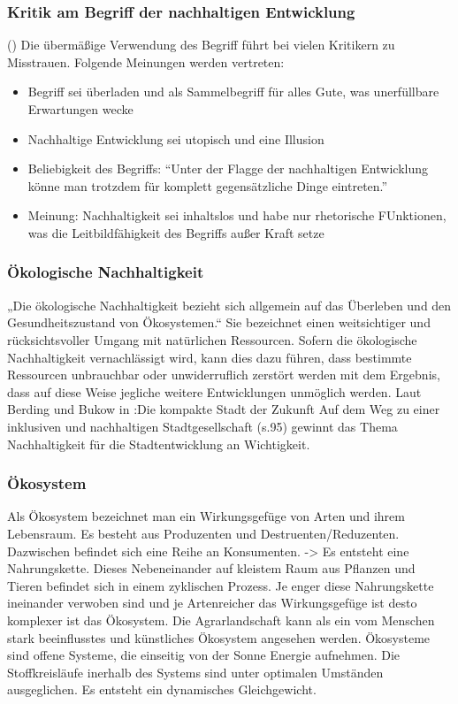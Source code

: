 \documentclass{article}
\begin{document}
\subsubsection{Kritik am Begriff der nachhaltigen Entwicklung}(\cite{NachhaltigeBrockhaus.de})
Die übermäßige Verwendung des Begriff führt bei vielen Kritikern zu Misstrauen. Folgende Meinungen werden vertreten:

\begin{itemize}
\item Begriff sei überladen und als Sammelbegriff für alles Gute, was unerfüllbare Erwartungen wecke
\item Nachhaltige Entwicklung sei utopisch und eine Illusion
\item Beliebigkeit des Begriffs: “Unter der Flagge der nachhaltigen Entwicklung könne man trotzdem für komplett gegensätzliche Dinge eintreten.”
\item Meinung: Nachhaltigkeit sei inhaltslos und habe nur rhetorische FUnktionen, was die Leitbildfähigkeit des Begriffs außer Kraft setze
\end{itemize}

\subsubsection{Ökologische Nachhaltigkeit}
„Die ökologische Nachhaltigkeit bezieht sich allgemein auf das Überleben und den Gesundheitszustand von Ökosystemen.“ \cite{DefinitionWirtschaftslexikonc}  Sie bezeichnet einen weitsichtiger und rücksichtsvoller Umgang mit natürlichen Ressourcen. Sofern die ökologische Nachhaltigkeit vernachlässigt wird, kann dies dazu führen, dass bestimmte Ressourcen unbrauchbar oder unwiderruflich zerstört werden mit dem Ergebnis, dass auf diese Weise jegliche weitere Entwicklungen unmöglich werden. Laut Berding und Bukow in :Die kompakte Stadt der Zukunft Auf dem Weg zu einer inklusiven und nachhaltigen Stadtgesellschaft (s.95) \cite{BerdingWolf-DietrichBukowKarinCudakHrsgDieStadtgesellschaft} gewinnt das Thema Nachhaltigkeit für die Stadtentwicklung an Wichtigkeit. 



\subsubsection{Ökosystem}
Als Ökosystem bezeichnet man ein Wirkungsgefüge von Arten und ihrem Lebensraum. Es besteht aus Produzenten und Destruenten/Reduzenten. Dazwischen befindet sich eine Reihe an Konsumenten. -> Es entsteht eine Nahrungskette. Dieses Nebeneinander auf kleistem Raum aus Pflanzen und Tieren befindet sich in einem zyklischen Prozess. Je enger diese Nahrungskette ineinander verwoben sind und je Artenreicher das Wirkungsgefüge ist desto komplexer ist das Ökosystem.\cite{NachhaltigeBrockhaus.de} Die Agrarlandschaft kann als ein vom Menschen stark beeinflusstes und künstliches Ökosystem angesehen werden.
Ökosysteme sind offene Systeme, die einseitig von der Sonne Energie aufnehmen. Die Stoffkreisläufe inerhalb des Systems sind unter optimalen Umständen ausgeglichen. Es entsteht ein dynamisches Gleichgewicht.
\end{document}
